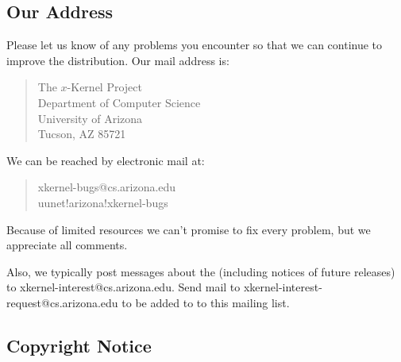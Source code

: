\subsection{Our Address}

Please let us know of any problems you encounter so that we can
continue to improve the distribution. Our mail address is:

\begin{quote}
The $x$-Kernel Project\\
Department of Computer Science\\
University of Arizona\\
Tucson, AZ 85721
\end{quote}

\noindent We can be reached by electronic mail at:

\begin{quote}
xkernel-bugs@cs.arizona.edu\\
uunet!arizona!xkernel-bugs
\end{quote}

\noindent Because of limited resources we can't promise to fix every 
problem, but we appreciate all comments.

Also, we typically post messages about the \xk{} (including notices of
future releases) to xkernel-interest@cs.arizona.edu. Send mail to
xkernel-interest-request@cs.arizona.edu to be added to to this mailing
list.

\subsection{Copyright Notice}


